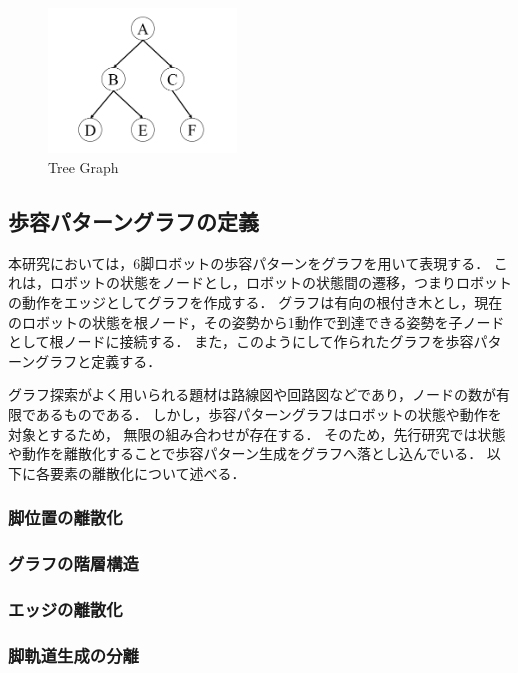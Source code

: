 \begin{figure}[tbp]
  \begin{center}
    \includegraphics[width=50mm, clip]{figure/tree_graph.png}
   \caption{Tree Graph}
   \label{fig:tree_graph}
  \end{center}
\end{figure}

\subsection{歩容パターングラフの定義}
本研究においては，6脚ロボットの歩容パターンをグラフを用いて表現する．
これは，ロボットの状態をノードとし，ロボットの状態間の遷移，つまりロボットの動作をエッジとしてグラフを作成する．
グラフは有向の根付き木とし，現在のロボットの状態を根ノード，その姿勢から1動作で到達できる姿勢を子ノードとして根ノードに接続する．
また，このようにして作られたグラフを歩容パターングラフと定義する．

グラフ探索がよく用いられる題材は路線図や回路図などであり，ノードの数が有限であるものである．
しかし，歩容パターングラフはロボットの状態や動作を対象とするため，
無限の組み合わせが存在する．
そのため，先行研究では状態や動作を離散化することで歩容パターン生成をグラフへ落とし込んでいる．
以下に各要素の離散化について述べる．

\subsubsection{脚位置の離散化}

\subsubsection{グラフの階層構造}
\subsubsection{エッジの離散化}
\subsubsection{脚軌道生成の分離}

